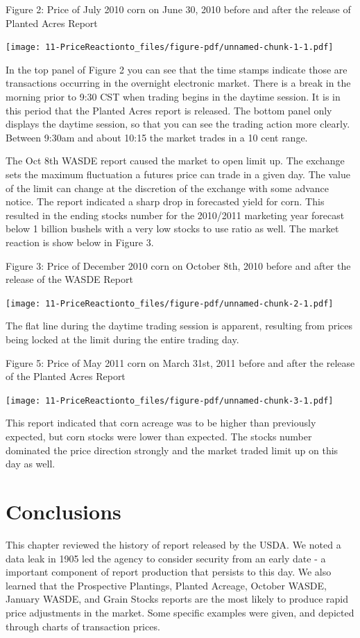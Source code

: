 \documentclass[
  letterpaper,
  DIV=11,
  numbers=noendperiod]{scrreprt}
\begin{document}
Figure 2: Price of July 2010 corn on June 30, 2010 before and after the
release of Planted Acres Report

\texttt{[image: 11-PriceReactionto\_files/figure-pdf/unnamed-chunk-1-1.pdf]}

In the top panel of Figure 2 you can see that the time stamps indicate
those are transactions occurring in the overnight electronic market.
There is a break in the morning prior to 9:30 CST when trading begins in
the daytime session. It is in this period that the Planted Acres report
is released. The bottom panel only displays the daytime session, so that
you can see the trading action more clearly. Between 9:30am and about
10:15 the market trades in a 10 cent range.

The Oct 8th WASDE report caused the market to open limit up. The
exchange sets the maximum fluctuation a futures price can trade in a
given day. The value of the limit can change at the discretion of the
exchange with some advance notice. The report indicated a sharp drop in
forecasted yield for corn. This resulted in the ending stocks number for
the 2010/2011 marketing year forecast below 1 billion bushels with a
very low stocks to use ratio as well. The market reaction is show below
in Figure 3.

Figure 3: Price of December 2010 corn on October 8th, 2010 before and
after the release of the WASDE Report

\texttt{[image: 11-PriceReactionto\_files/figure-pdf/unnamed-chunk-2-1.pdf]}

The flat line during the daytime trading session is apparent, resulting
from prices being locked at the limit during the entire trading day.

Figure 5: Price of May 2011 corn on March 31st, 2011 before and after
the release of the Planted Acres Report

\texttt{[image: 11-PriceReactionto\_files/figure-pdf/unnamed-chunk-3-1.pdf]}

This report indicated that corn acreage was to be higher than previously
expected, but corn stocks were lower than expected. The stocks number
dominated the price direction strongly and the market traded limit up on
this day as well.

\section{Conclusions}\label{conclusions}

This chapter reviewed the history of report released by the USDA. We
noted a data leak in 1905 led the agency to consider security from an
early date - a important component of report production that persists to
this day. We also learned that the Prospective Plantings, Planted
Acreage, October WASDE, January WASDE, and Grain Stocks reports are the
most likely to produce rapid price adjustments in the market. Some
specific examples were given, and depicted through charts of transaction
prices.
\end{document}

